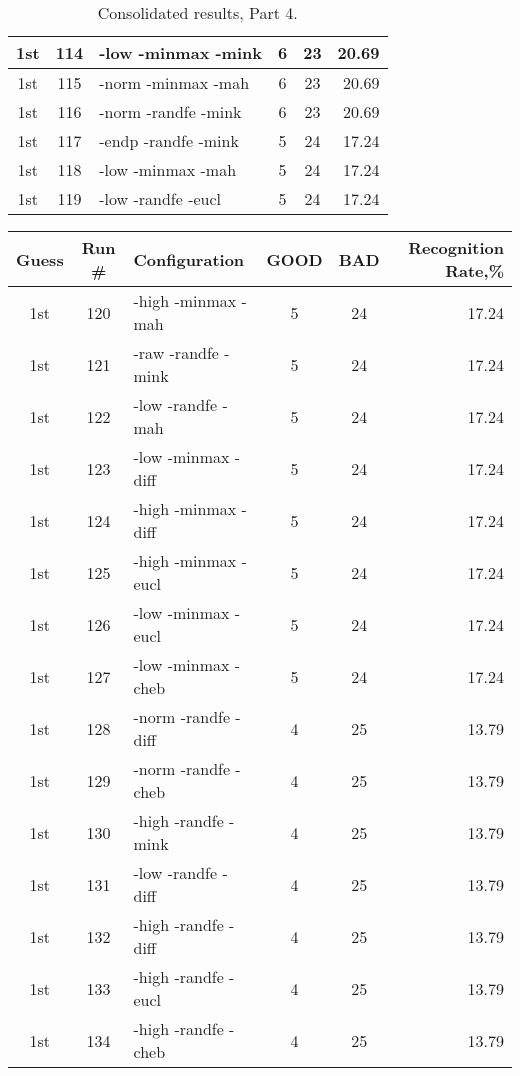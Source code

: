 \begin{table}
\begin{minipage}[b]{\textwidth}
\begin{tabular}{|c|c|l|c|c|r|}
1st & 114 & -low -minmax -mink  & 6 & 23 & 20.69\\ \hline
1st & 115 & -norm -minmax -mah  & 6 & 23 & 20.69\\ \hline
1st & 116 & -norm -randfe -mink  & 6 & 23 & 20.69\\ \hline
1st & 117 & -endp -randfe -mink  & 5 & 24 & 17.24\\ \hline
1st & 118 & -low -minmax -mah  & 5 & 24 & 17.24\\ \hline
1st & 119 & -low -randfe -eucl  & 5 & 24 & 17.24\\ \hline
\end{tabular}
\end{minipage}
\caption{Consolidated results, Part 4.}
\label{tab:results4}
\end{table}

\begin{table}
\begin{minipage}[b]{\textwidth}
\centering
\begin{tabular}{|c|c|l|c|c|r|} \hline
Guess & Run \# & Configuration & GOOD & BAD & Recognition Rate,\%\\ \hline\hline
1st & 120 & -high -minmax -mah  & 5 & 24 & 17.24\\ \hline
1st & 121 & -raw -randfe -mink  & 5 & 24 & 17.24\\ \hline
1st & 122 & -low -randfe -mah  & 5 & 24 & 17.24\\ \hline
1st & 123 & -low -minmax -diff  & 5 & 24 & 17.24\\ \hline
1st & 124 & -high -minmax -diff  & 5 & 24 & 17.24\\ \hline
1st & 125 & -high -minmax -eucl  & 5 & 24 & 17.24\\ \hline
1st & 126 & -low -minmax -eucl  & 5 & 24 & 17.24\\ \hline
1st & 127 & -low -minmax -cheb  & 5 & 24 & 17.24\\ \hline
1st & 128 & -norm -randfe -diff  & 4 & 25 & 13.79\\ \hline
1st & 129 & -norm -randfe -cheb  & 4 & 25 & 13.79\\ \hline
1st & 130 & -high -randfe -mink  & 4 & 25 & 13.79\\ \hline
1st & 131 & -low -randfe -diff  & 4 & 25 & 13.79\\ \hline
1st & 132 & -high -randfe -diff  & 4 & 25 & 13.79\\ \hline
1st & 133 & -high -randfe -eucl  & 4 & 25 & 13.79\\ \hline
1st & 134 & -high -randfe -cheb  & 4 & 25 & 13.79\\ \hline

\end{tabular}
\end{minipage}
\end{table}
